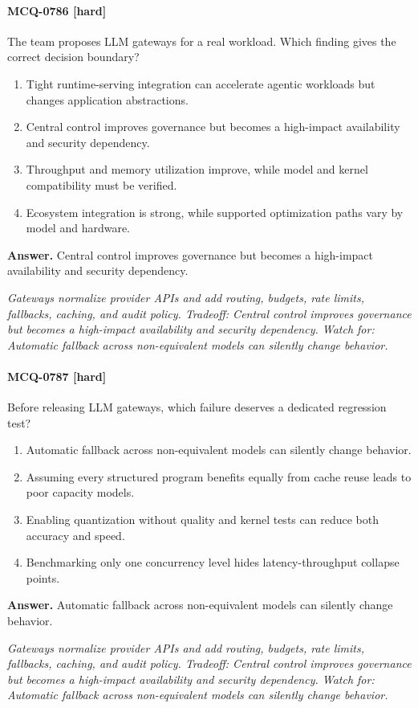 \paragraph{MCQ-0786 [hard]} The team proposes LLM gateways for a real workload. Which finding gives the correct decision boundary?
\begin{enumerate}[label=\Alph*.]
\item Tight runtime-serving integration can accelerate agentic workloads but changes application abstractions.
\item Central control improves governance but becomes a high-impact availability and security dependency.
\item Throughput and memory utilization improve, while model and kernel compatibility must be verified.
\item Ecosystem integration is strong, while supported optimization paths vary by model and hardware.
\end{enumerate}
\noindent\textbf{Answer.} Central control improves governance but becomes a high-impact availability and security dependency.
\par\textit{Gateways normalize provider APIs and add routing, budgets, rate limits, fallbacks, caching, and audit policy. Tradeoff: Central control improves governance but becomes a high-impact availability and security dependency. Watch for: Automatic fallback across non-equivalent models can silently change behavior.}
\paragraph{MCQ-0787 [hard]} Before releasing LLM gateways, which failure deserves a dedicated regression test?
\begin{enumerate}[label=\Alph*.]
\item Automatic fallback across non-equivalent models can silently change behavior.
\item Assuming every structured program benefits equally from cache reuse leads to poor capacity models.
\item Enabling quantization without quality and kernel tests can reduce both accuracy and speed.
\item Benchmarking only one concurrency level hides latency-throughput collapse points.
\end{enumerate}
\noindent\textbf{Answer.} Automatic fallback across non-equivalent models can silently change behavior.
\par\textit{Gateways normalize provider APIs and add routing, budgets, rate limits, fallbacks, caching, and audit policy. Tradeoff: Central control improves governance but becomes a high-impact availability and security dependency. Watch for: Automatic fallback across non-equivalent models can silently change behavior.}
